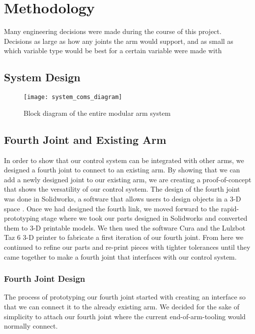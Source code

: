 \section{Methodology}
Many engineering decisions were made during the course of this project. Decisions as large as how any joints the arm would support, and as small as which variable type would be best for a certain variable were made with 

\subsection{System Design}
\begin{figure}[H]
	\centering
	\texttt{[image: system\_coms\_diagram]}
	\caption{Block diagram of the entire modular arm system}
	\label{fig:system_block_diagram}
\end{figure}


\subsection{Fourth Joint and Existing Arm}
In order to show that our control system can be integrated with other arms, we designed a fourth joint to connect to an existing arm. By showing that we can add a newly designed joint to our existing arm, we are creating a proof-of-concept that shows the versatility of our control system.  The design of the fourth joint was done in Solidworks, a software that allows users to design objects in a 3-D space \cite{Solidworks}. Once we had designed the fourth link, we moved forward to the rapid-prototyping stage where we took our parts designed in Solidworks and converted them to 3-D printable models.  We then used the software Cura \cite{Cura} and the Lulzbot Taz 6 3-D printer \cite{Taz6} to fabricate a first iteration of our fourth joint.  From here we continued to refine our parts and re-print pieces with tighter tolerances until they came together to make a fourth joint that interfaces with our control system.

\subsubsection{Fourth Joint Design}
The process of prototyping our fourth joint started with creating an interface so that we can connect it to the already existing arm.  We decided for the sake of simplicity to attach our fourth joint where the current end-of-arm-tooling would normally connect. \\

